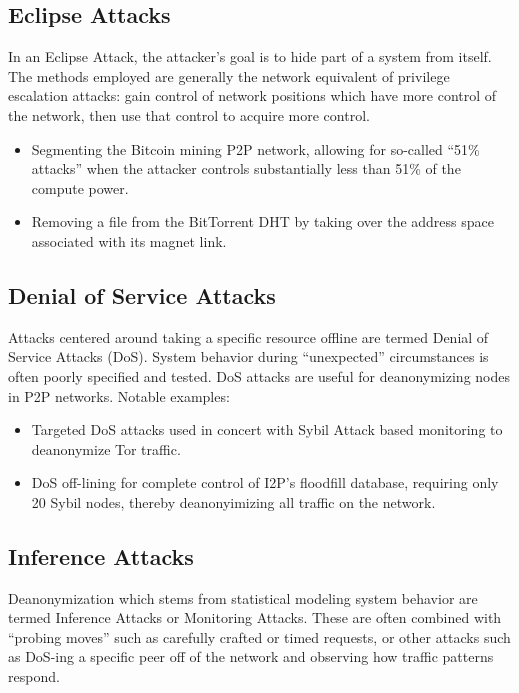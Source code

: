 \subsection{Eclipse Attacks}

In an Eclipse Attack, the attacker's goal is to hide part of a system from itself. The methods employed are generally the network equivalent of privilege escalation attacks: gain control of network positions which have more control of the network, then use that control to acquire more control.

\begin{itemize}
\item Segmenting the Bitcoin mining P2P network, allowing for so-called “51\% attacks” when the attacker controls substantially less than 51\% of the compute power\cite{bitcoinEclipse}.
\item Removing a file from the BitTorrent DHT by taking over the address space associated with its magnet link\cite{bittorrentSybilAttacks}.
\end{itemize}

\subsection{Denial of Service Attacks}

Attacks centered around taking a specific resource offline are termed Denial of Service Attacks (DoS). System behavior during “unexpected” circumstances is often poorly specified and tested. DoS attacks are useful for deanonymizing nodes in P2P networks. Notable examples:

\begin{itemize}
\item Targeted DoS attacks used in concert with Sybil Attack based monitoring to deanonymize Tor traffic\cite{DOSvsSec}.
\item DoS off-lining for complete control of I2P’s floodfill database, requiring only 20 Sybil nodes, thereby deanonyimizing all traffic on the network\cite{I2P-vigna}.
\end{itemize}

\subsection{Inference Attacks}
\label{inference-attacks}

Deanonymization which stems from statistical modeling system behavior are termed Inference Attacks or Monitoring Attacks. These are often combined with “probing moves” such as carefully crafted or timed requests, or other attacks such as DoS-ing a specific peer off of the network and observing how traffic patterns respond.

